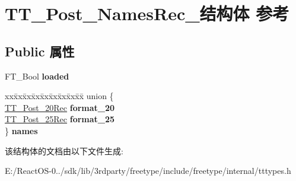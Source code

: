 \hypertarget{struct_t_t___post___names_rec__}{}\section{T\+T\+\_\+\+Post\+\_\+\+Names\+Rec\+\_\+结构体 参考}
\label{struct_t_t___post___names_rec__}
\subsection*{Public 属性}
\begin{DoxyCompactItemize}
\item 
\mbox{\label{struct_t_t___post___names_rec___a8878ac4555c3df60958869f0d53383c9}} 
F\+T\+\_\+\+Bool {\bfseries loaded}
\item 
\mbox{\label{struct_t_t___post___names_rec___a25ebcca838c41adb01c2ec116213c517}} 
\begin{tabbing}
xx\=xx\=xx\=xx\=xx\=xx\=xx\=xx\=xx\=\kill
union \{\\
\>\hyperlink{struct_t_t___post__20_rec__}{TT\_Post\_20Rec} {\bfseries format\_20}\\
\>\hyperlink{struct_t_t___post__25__}{TT\_Post\_25Rec} {\bfseries format\_25}\\
\} {\bfseries names}\\

\end{tabbing}\end{DoxyCompactItemize}


该结构体的文档由以下文件生成\+:\begin{DoxyCompactItemize}
\item 
E\+:/\+React\+O\+S-\/0../sdk/lib/3rdparty/freetype/include/freetype/internal/tttypes.\+h\end{DoxyCompactItemize}
